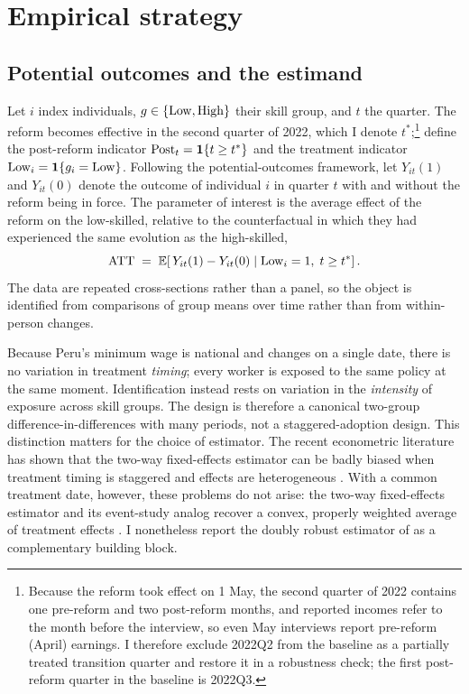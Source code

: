 \section{Empirical strategy}\label{sec:strategy}

\subsection{Potential outcomes and the estimand}

Let $i$ index individuals, $g\in\{\mathrm{Low},\mathrm{High}\}$ their skill group, and $t$ the
quarter. The reform becomes effective in the second quarter of 2022, which I denote
$t^{\ast}$;\footnote{Because the reform took effect on 1 May, the second quarter of 2022
contains one pre-reform and two post-reform months, and reported incomes refer to the
month before the interview, so even May interviews report pre-reform (April) earnings.
I therefore exclude 2022Q2 from the baseline as a partially treated transition quarter
and restore it in a robustness check; the first post-reform quarter in the baseline is
2022Q3.} define the post-reform indicator $\mathrm{Post}_t=\mathbf{1}\{t\ge t^{\ast}\}$ and
the treatment indicator $\mathrm{Low}_i=\mathbf{1}\{g_i=\mathrm{Low}\}$. Following the potential-outcomes
framework, let $Y_{it}(1)$ and $Y_{it}(0)$ denote the outcome of individual $i$ in
quarter $t$ with and without the reform being in force. The parameter of interest is the
average effect of the reform on the low-skilled, relative to the counterfactual in which
they had experienced the same evolution as the high-skilled,
\begin{equation}
\mathrm{ATT} \;=\; \mathbb{E}\!\left[\,Y_{it}(1)-Y_{it}(0)\;\middle|\;\mathrm{Low}_i=1,\;t\ge t^{\ast}\right].
\end{equation}
The data are repeated cross-sections rather than a panel, so the object is identified from
comparisons of group means over time rather than from within-person changes.

Because Peru's minimum wage is national and changes on a single date, there is no variation
in treatment \emph{timing}; every worker is exposed to the same policy at the same moment.
Identification instead rests on variation in the \emph{intensity} of exposure across skill
groups. The design is therefore a canonical two-group difference-in-differences with many
periods, not a staggered-adoption design. This distinction matters for the choice of
estimator. The recent econometric literature has shown that the two-way fixed-effects
estimator can be badly biased when treatment timing is staggered and effects are
heterogeneous \citep{goodmanbacon_2021, dechaisemartin_2020, sun_abraham_2021,
callaway_santanna_2021}. With a common treatment date, however, these problems do not
arise: the two-way fixed-effects estimator and its event-study analog recover a convex,
properly weighted average of treatment effects \citep{roth_2023_trending,
baker_larcker_wang_2022}. I nonetheless report the doubly robust estimator of
\citet{santanna_zhao_2020} as a complementary building block.

